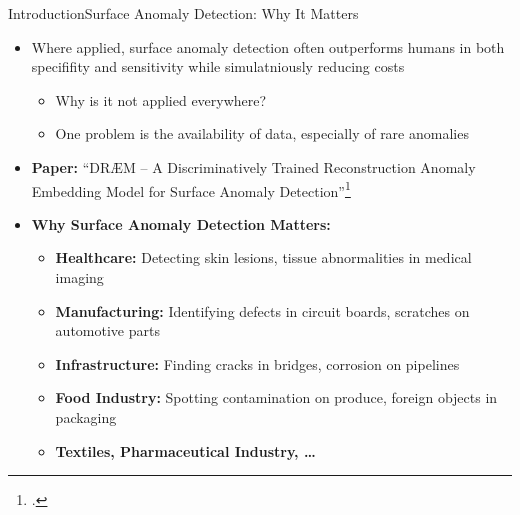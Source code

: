 \begin{frame}{Introduction}{Surface Anomaly Detection: Why It Matters}
    \begin{itemize}
        \item Where applied, surface anomaly detection often outperforms humans in both specififity and sensitivity while simulatniously reducing costs
        \pause
        \begin{itemize}
            \item Why is it not applied everywhere?
            \pause
            \item One problem is the availability of data, especially of rare anomalies
        \end{itemize}
        \pause
        
        \item \textbf{Paper:} ``DRÆM -- A Discriminatively Trained Reconstruction Anomaly Embedding Model for Surface Anomaly Detection''\footcite{zavrtanikDRAEMDiscriminativelyTrained2021}
        \pause
        
        \item \textbf{Why Surface Anomaly Detection Matters:}
        \begin{itemize}
            \item \textbf{Healthcare:} Detecting skin lesions, tissue abnormalities in medical imaging
            \item \textbf{Manufacturing:} Identifying defects in circuit boards, scratches on automotive parts
            \item \textbf{Infrastructure:} Finding cracks in bridges, corrosion on pipelines
            \item \textbf{Food Industry:} Spotting contamination on produce, foreign objects in packaging
            \item \textbf{Textiles, Pharmaceutical Industry, \ldots}
        \end{itemize}
    \end{itemize}
\end{frame}

